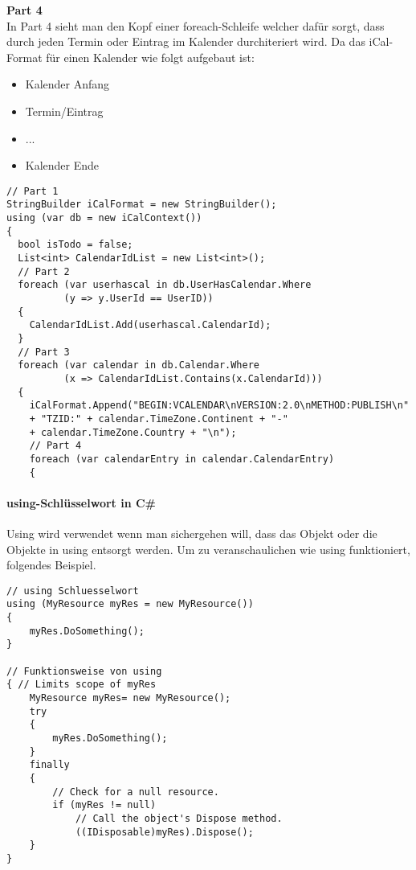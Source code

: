 \textbf{Part 4} \\
In Part 4 sieht man den Kopf einer foreach-Schleife welcher dafür sorgt, dass durch jeden Termin oder Eintrag im Kalender durchiteriert wird. Da das iCal-Format für einen Kalender wie folgt aufgebaut ist: 
\begin{itemize}
\item Kalender Anfang
\item Termin/Eintrag
\item ...
\item Kalender Ende
\end{itemize}

\begin{lstlisting}[caption=Parser Verbindung zur DB mit dem Entity Framework, label=lst:test]
// Part 1
StringBuilder iCalFormat = new StringBuilder();
using (var db = new iCalContext())
{
  bool isTodo = false;
  List<int> CalendarIdList = new List<int>();
  // Part 2
  foreach (var userhascal in db.UserHasCalendar.Where
  		  (y => y.UserId == UserID))
  {
	CalendarIdList.Add(userhascal.CalendarId);
  }
  // Part 3
  foreach (var calendar in db.Calendar.Where
  		  (x => CalendarIdList.Contains(x.CalendarId)))
  {
    iCalFormat.Append("BEGIN:VCALENDAR\nVERSION:2.0\nMETHOD:PUBLISH\n"
	+ "TZID:" + calendar.TimeZone.Continent + "-" 
    + calendar.TimeZone.Country + "\n");
    // Part 4
    foreach (var calendarEntry in calendar.CalendarEntry)
    {
\end{lstlisting} 
\paragraph{using-Schlüsselwort in C\#}
\label{usingkeyword}
Using wird verwendet wenn man sichergehen will, dass das Objekt oder die Objekte in using entsorgt werden. Um zu veranschaulichen wie using funktioniert, folgendes Beispiel.

\begin{lstlisting}[caption=Parser funktionsweise von using, label=lst:test]
// using Schluesselwort
using (MyResource myRes = new MyResource())
{
    myRes.DoSomething();
}
 
// Funktionsweise von using 
{ // Limits scope of myRes
    MyResource myRes= new MyResource();
    try
    {
        myRes.DoSomething();
    }
    finally
    {
        // Check for a null resource.
        if (myRes != null)
            // Call the object's Dispose method.
            ((IDisposable)myRes).Dispose();
    }
}
\end{lstlisting} 
\textcite{ParserUsingKeyword}
